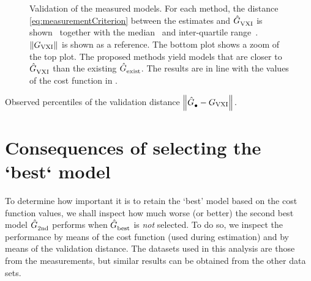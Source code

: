 \begin{figure}[p]
  \centering
  \setlength{\figurewidth}{0.85\columnwidth}
  \setlength{\figureheight}{0.68\figurewidth}
  \setlength{\figurewidth}{0.75\columnwidth}
  
  \caption[Validation cost of the different measurements.]{Validation of the measured models. 
  For each method, the distance \eqref{eq:measurementCriterion} between the estimates and $\hat{G}_{\mathrm{VXI}}^{\mathrm{}}$ is shown~ together with the median~ and inter-quartile range~.
  $\left\| G_{\mathrm{VXI}} \right\|_{}$ is shown as a reference.
  The bottom plot shows a zoom of the top plot.
  The proposed methods yield models that are closer to $\hat{G}_{\mathrm{VXI}}^{\mathrm{}}$ than the existing $\hat{G}_{\mathrm{exist}}^{\mathrm{}}$.
  The results are in line with the values of the cost function in .}
  \label{fig:validationMeasurements}
\end{figure}
\begin{table}[p]
  \centering
  \caption{Observed percentiles of the validation distance $\left\| \hat{G}_{\mathrm{\bullet}}^{\mathrm{}}-G_{\mathrm{VXI}} \right\|_{}$.}
% 
\label{tbl:validationMeasurements}
\end{table}

\section{Consequences of selecting the `best` model}
To determine how important it is to retain the `best' model based on the cost function values, we shall inspect how much worse (or better) the second best model $\hat{G}_{\mathrm{2nd}}^{\mathrm{}}$ performs when $\hat{G}_{\mathrm{best}}^{\mathrm{}}$ is \emph{not} selected.
To do so, we inspect the performance by means of the cost function (used during estimation) and by means of the validation distance.
The datasets used in this analysis are those from the measurements, but similar results can be obtained from the other data sets.

